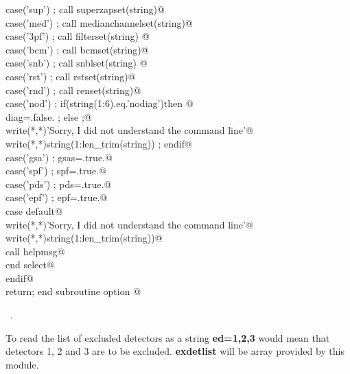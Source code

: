 \documentclass[10pt,a4paper,notitlepage]{article}
\newcommand{\var}[1]{\textbf{\textsf{#1}}} %
\newcommand{\code}[1]{\textbf{\textsf{#1}}} %
\begin{document}
\begin{flushleft}
\begin{minipage}{\linewidth}
\begin{list}{}{}
\mbox{}\verb@        case('sup') ; call superzapset(string)@\\
\mbox{}\verb@        case('med') ; call medianchannelset(string)@\\
\mbox{}\verb@        case('3pf') ; call filterset(string) @\\
\mbox{}\verb@        case('bcm') ; call bcmset(string)@\\
\mbox{}\verb@        case('snb') ; call snblset(string)      @\\
\mbox{}\verb@        case('rst') ; call rstset(string)@\\
\mbox{}\verb@        case('rnd') ; call renset(string)@\\
\mbox{}\verb@        case('nod') ; if(string(1:6).eq.'nodiag')then @\\
\mbox{}\verb@          diag=.false. ; else ;@\\
\mbox{}\verb@          write(*,*)'Sorry, I did not understand the command line'@\\
\mbox{}\verb@          write(*,*)string(1:len_trim(string)) ; endif@\\
\mbox{}\verb@        case('gsa') ; gsas=.true.@\\
\mbox{}\verb@        case('spf') ; spf=.true.@\\
\mbox{}\verb@        case('pds') ; pds=.true.@\\
\mbox{}\verb@        case('epf') ; epf=.true.@\\
\mbox{}\verb@        case default@\\
\mbox{}\verb@          write(*,*)'Sorry, I did not understand the command line'@\\
\mbox{}\verb@          write(*,*)string(1:len_trim(string))@\\
\mbox{}\verb@          call helpmsg@\\
\mbox{}\verb@        end select@\\
\mbox{}\verb@      endif@\\
\mbox{}\verb@      return; end subroutine option                                          @{\NWsep}
\end{list}
\vspace{-1.5ex}
\footnotesize
\begin{list}{}{\setlength{\itemsep}{-\parsep}\setlength{\itemindent}{-\leftmargin}}
\item \NWtxtMacroRefIn\ .

\item{}
\end{list}
\end{minipage}\vspace{4ex}
\end{flushleft}
To read the list of excluded detectors as a string \code{ ed=1,2,3} would mean
that detectors 1, 2 and 3 are to be excluded. \var{exdetlist} will be 
array provided by this module.
\end{document}
